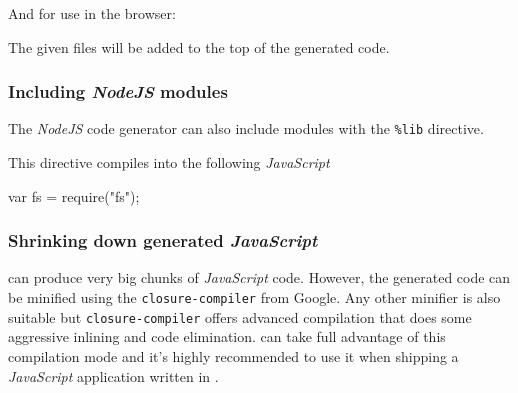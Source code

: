 \noindent
And for use in the browser:

\begin{code}
\end{code}

\noindent
The given files will be added to the top of the generated code.

\subsubsection*{Including \emph{NodeJS} modules}

\noindent
The \emph{NodeJS} code generator can also include modules with the \texttt{\%lib}
directive.

\begin{code}
\end{code}

\noindent
This directive compiles into the following \emph{JavaScript}

\begin{code}
  var fs = require("fs");
\end{code}

\subsubsection*{Shrinking down generated \emph{JavaScript}}

\Idris{} can produce very big chunks of \emph{JavaScript} code.
However, the generated code can be minified using the \texttt{closure-compiler} from Google.
Any other minifier is also suitable but \texttt{closure-compiler} offers advanced compilation that does some aggressive inlining and code elimination.
\Idris{} can take full advantage of this compilation mode and it's highly recommended to use it when shipping a \emph{JavaScript} application written in \Idris{}.

